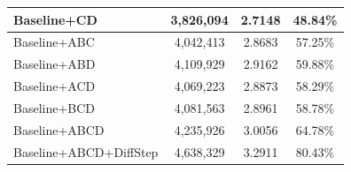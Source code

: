 \begin{table}[ht]
\begin{tabular}{@{}lccc@{}}
Baseline+CD            & 3,826,094                                                                                                                                                 & 2.7148                                                                                                                                                 & 48.84\% \\ \midrule %
Baseline+ABC           & 4,042,413                                                                                                                                                 & 2.8683                                                                                                                                                 & 57.25\% \\ %
Baseline+ABD           & 4,109,929                                                                                                                                                 & 2.9162                                                                                                                                                 & 59.88\% \\ %
Baseline+ACD           & 4,069,223                                                                                                                                                 & 2.8873                                                                                                                                                 & 58.29\% \\ %
Baseline+BCD           & 4,081,563                                                                                                                                                 & 2.8961                                                                                                                                                 & 58.78\% \\ \midrule %
Baseline+ABCD          & 4,235,926                                                                                                                                                 & 3.0056                                                                                                                                                 & 64.78\% \\ %
Baseline+ABCD+DiffStep & 4,638,329                                                                                                                                                 & 3.2911                                                                                                                                                 & 80.43\% \\ \bottomrule %
\end{tabular}
\end{table}
